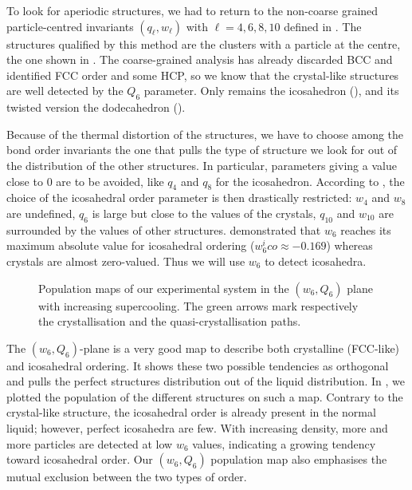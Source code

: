 To look for aperiodic structures, we had to return to the non-coarse grained particle-centred invariants $(q_\ell, w_\ell)$ with $\ell=4,6,8,10$ defined in . The structures qualified by this method are the clusters with a particle at the centre,  the one shown in . The coarse-grained analysis has already discarded \ac{BCC} and identified \ac{FCC} order and some \ac{HCP}, so we know that the crystal-like structures are well detected by the $Q_6$ parameter. Only remains the icosahedron (), and its twisted version the dodecahedron ().

Because of the thermal distortion of the structures, we have to choose among the bond order invariants the one that pulls the type of structure we look for out of the distribution of the other structures. In particular, parameters giving a value close to $0$ are to be avoided, like $q_4$ and $q_8$ for the icosahedron. According to , the choice of the icosahedral order parameter is then drastically restricted: $w_4$ and $w_8$ are undefined, $q_6$ is large but close to the values of the crystals, $q_{10}$ and $w_{10}$ are surrounded by the values of other structures. \citet{steinhardt1983boo} demonstrated that $w_6$ reaches its maximum absolute value for icosahedral ordering ($w_6^ico \approx -0.169$) whereas crystals are almost zero-valued. Thus we will use $w_6$ to detect icosahedra.

\begin{figure}
	\centering
	\def\svgwidth{0.8\textwidth}
	
	\caption{Population maps of our experimental system in the $(w_6, Q_6)$ plane with increasing supercooling. The green arrows mark respectively the crystallisation and the quasi-crystallisation paths.}
	\label{fig:sc_w6Q6}
\end{figure}

The $(w_6, Q_6)$-plane is a very good map to describe both crystalline (\ac{FCC}-like) and icosahedral ordering. It shows these two possible tendencies as orthogonal and pulls the perfect structures distribution out of the liquid distribution. In , we plotted the population of the different structures on such a map. Contrary to the crystal-like structure, the icosahedral order is already present in the normal liquid; however, perfect icosahedra are few. With increasing density, more and more particles are detected at low $w_6$ values, indicating a growing tendency toward icosahedral order. Our $(w_6, Q_6)$ population map also emphasises the mutual exclusion between the two types of order.


